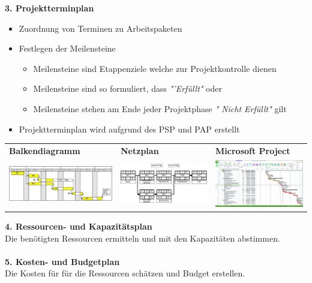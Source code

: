 \textbf{3. Projektterminplan}
\begin{itemize}
	\item Zuordnung von Terminen zu Arbeitspaketen
	\item Festlegen der Meilensteine
    \begin{itemize}
    	\item Meilensteine sind Etappenziele welche zur Projektkontrolle dienen
    	\item Meilensteine sind so formuliert, dass \textit{"'Erfüllt"} oder
    	\item Meilensteine stehen am Ende jeder Projektphase
    	\textit{" Nicht Erfüllt"} gilt
    \end{itemize}
	\item Projektterminplan wird aufgrund des PSP und PAP erstellt
\end{itemize}
\begin{table}[h!]
	\begin{tabular}{l l l}
		 \textbf{Balkendiagramm} & \textbf{Netzplan} & \textbf{Microsoft Project} \\
		 \includegraphics[width=6cm]{images/balkendiagramm} & \includegraphics[width=6cm]{images/netzplan}	& \includegraphics[width=6cm]{images/msproject}	 
	\end{tabular}
\end{table}
\vspace{0.2cm}
\textbf{4. Ressourcen- und Kapazitätsplan}\\
Die benötigten Ressourcen ermitteln und mit den Kapazitäten abstimmen. 
\\
\\
\textbf{5. Kosten- und Budgetplan}\\
Die Kosten für für die Ressourcen schätzen und Budget erstellen. 

